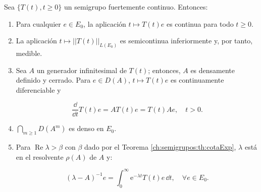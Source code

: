 \begin{Teorema}
\label{ch:semigrupos:th:resSemiFuerteCont}

Sea $\{T(t), t \geq 0\}$ un semigrupo fuertemente continuo. Entonces:
\begin{enumerate}
    \item Para cualquier $e \in E_0$, la aplicación $t \mapsto T(t)e$ es continua para todo $t \ge 0$.

    \item La aplicación $t \mapsto ||T(t)||_{L(E_0)}$ es semicontinua inferiormente y, por tanto, medible.

    \item Sea $A$ un generador infinitesimal de $T(t)$; entonces, $A$ es densamente definido y cerrado. Para $e \in D(A)$, $t \mapsto T(t) e$ es continuamente diferenciable y

    \[\frac{\dd}{\dd t}T(t)e = AT(t)e = T(t)Ae, \quad t > 0.\]

    \item $\bigcap_{m \geq 1} D(A^m)$ es denso en $E_0$.

    \item Para $\operatorname{Re}\lambda > \beta$ con $\beta$ dado por el Teorema \ref{ch:semigrupos:th:cotaExp}, $\lambda$ está en el resolvente $\rho(A)$ de $A$ y:

    \[(\lambda - A)^{-1}e = \int_{0}^\infty \mathrm{e}^{-\lambda t}T(t) e \, \dd t, \quad \forall e \in E_0. \]
\end{enumerate}
\end{Teorema}

